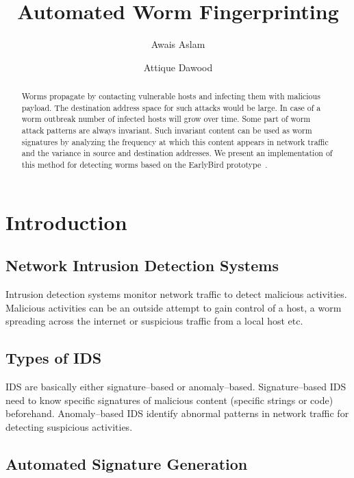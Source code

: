 \documentclass{report}
\begin{document}
\title{Automated Worm Fingerprinting}
\author{Awais Aslam \and Attique Dawood}
\maketitle

\tableofcontents
\listoffigures

\begin{abstract}
Worms propagate by contacting vulnerable hosts and infecting them with malicious payload.
The destination address space for such attacks would be large. In case of a worm outbreak
number of infected hosts will grow over time. Some part of worm attack patterns are always
invariant. Such invariant content can be used as worm signatures by analyzing the frequency
at which this content appears in network traffic and the variance in source and destination
addresses. We present an implementation of this method for detecting worms based on the
EarlyBird prototype~\cite{DBLP:conf/osdi/SinghEVS04}.
\end{abstract}

\chapter{Introduction}
\section{Network Intrusion Detection Systems}

Intrusion detection systems monitor network traffic to detect malicious activities. Malicious activities can be an outside attempt to gain control of a host, a worm spreading across the internet or suspicious traffic from a local host etc.

\section{Types of IDS}

IDS are basically either signature--based or anomaly--based. Signature--based IDS need to know specific signatures of malicious content (specific strings or code) beforehand. Anomaly--based IDS identify abnormal patterns in network traffic for detecting suspicious activities.

\section{Automated Signature Generation}
\end{document}
